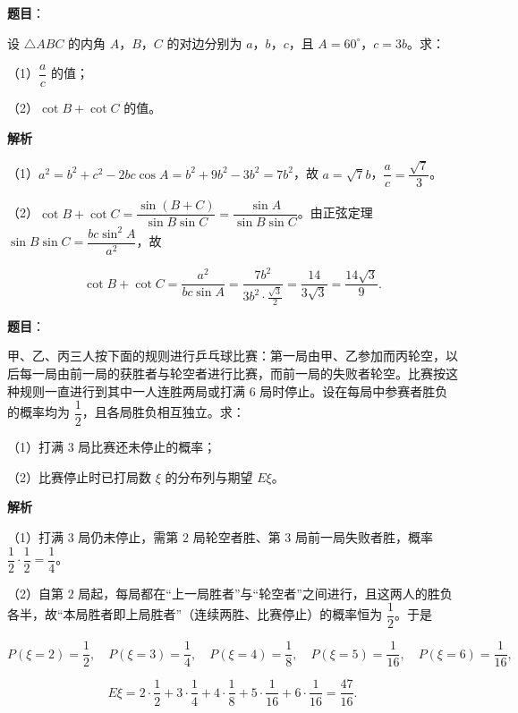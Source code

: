 \begin{answer}

\textbf{题目}：

设 $\triangle ABC$ 的内角 $A$，$B$，$C$ 的对边分别为 $a$，$b$，$c$，且 $A=60^\circ$，$c=3b$。求：

（1）$\dfrac ac$ 的值；

（2）$\cot B+\cot C$ 的值。

\textbf{解析}

（1）$a^2=b^2+c^2-2bc\cos A=b^2+9b^2-3b^2=7b^2$，故 $a=\sqrt7b$，$\dfrac ac=\dfrac{\sqrt7}3$。

（2）$\cot B+\cot C=\dfrac{\sin(B+C)}{\sin B\sin C}=\dfrac{\sin A}{\sin B\sin C}$。由正弦定理 $\sin B\sin C=\dfrac{bc\sin^2A}{a^2}$，故

\nopagebreak[4]
\[\cot B+\cot C=\frac{a^2}{bc\sin A}=\frac{7b^2}{3b^2\cdot\frac{\sqrt3}2}=\frac{14}{3\sqrt3}=\frac{14\sqrt3}9.\]


\end{answer}
\begin{answer}

\textbf{题目}：

甲、乙、丙三人按下面的规则进行乒乓球比赛：第一局由甲、乙参加而丙轮空，以后每一局由前一局的获胜者与轮空者进行比赛，而前一局的失败者轮空。比赛按这种规则一直进行到其中一人连胜两局或打满 $6$ 局时停止。设在每局中参赛者胜负的概率均为 $\dfrac12$，且各局胜负相互独立。求：

（1）打满 $3$ 局比赛还未停止的概率；

（2）比赛停止时已打局数 $\xi$ 的分布列与期望 $E\xi$。

\textbf{解析}

（1）打满 $3$ 局仍未停止，需第 $2$ 局轮空者胜、第 $3$ 局前一局失败者胜，概率 $\dfrac12\cdot\dfrac12=\dfrac14$。

（2）自第 $2$ 局起，每局都在“上一局胜者”与“轮空者”之间进行，且这两人的胜负各半，故“本局胜者即上局胜者”（连续两胜、比赛停止）的概率恒为 $\dfrac12$。于是

\nopagebreak[4]
\[P(\xi=2)=\frac12,\quad P(\xi=3)=\frac14,\quad P(\xi=4)=\frac18,\quad P(\xi=5)=\frac1{16},\quad P(\xi=6)=\frac1{16},\]

\nopagebreak[4]
\[E\xi=2\cdot\frac12+3\cdot\frac14+4\cdot\frac18+5\cdot\frac1{16}+6\cdot\frac1{16}=\frac{47}{16}.\]


\end{answer}
